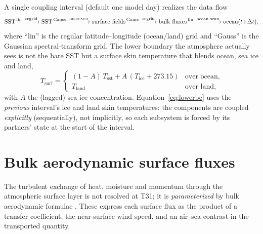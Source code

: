 A single coupling interval (default one model day) realizes the data flow
\begin{equation}
  \mathrm{SST}^{\,\mathrm{lin}}
  \xrightarrow{\text{regrid}} \mathrm{SST}^{\,\mathrm{Gauss}}
  \xrightarrow{\textsc{dinosaur}{}} \text{surface fields}^{\,\mathrm{Gauss}}
  \xrightarrow{\text{regrid}} \text{bulk fluxes}^{\,\mathrm{lin}}
  \xrightarrow{\text{ocean scan}} \text{ocean}(t{+}\Delta t),
  \label{eq:cycle}
\end{equation}
where ``lin'' is the regular latitude--longitude (ocean/land) grid and ``Gauss''
is the \dino{} Gaussian spectral-transform grid. The lower boundary the
atmosphere actually sees is not the bare SST but a surface skin temperature that
blends ocean, sea ice and land,
\begin{equation}
  T_{\mathrm{surf}} =
  \begin{cases}
    (1-A)\,T_{\mathrm{sst}} + A\,(T_{\mathrm{ice}} + 273.15) & \text{over ocean},\\[2pt]
    T_{\mathrm{land}} & \text{over land},
  \end{cases}
  \label{eq:lowerbc}
\end{equation}
with $A$ the (lagged) sea-ice concentration. Equation~\eqref{eq:lowerbc} uses the
\emph{previous} interval's ice and land skin temperatures: the components are
coupled \emph{explicitly} (sequentially), not implicitly, so each subsystem is
forced by its partners' state at the start of the interval.

\section{Bulk aerodynamic surface fluxes}

The turbulent exchange of heat, moisture and momentum through the atmospheric
surface layer is not resolved at T31; it is \emph{parameterized} by bulk
aerodynamic formulae \citep{vallis2017,largeyeager2004}. These express each surface flux as the
product of a transfer coefficient, the near-surface wind speed, and an air--sea
contrast in the transported quantity.

